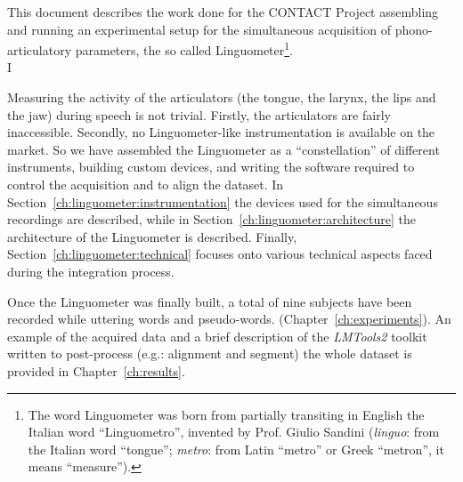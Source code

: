 This document
describes the work done for the 
CONTACT Project assembling and running an experimental setup for the 
simultaneous acquisition of phono-articulatory parameters, the so called 
Linguometer\footnote{The 
word Linguometer was born from partially transiting in English the Italian word
``Linguometro'', invented by Prof. Giulio Sandini
(\emph{linguo}: from the Italian word ``tongue''; \emph{metro}: from Latin 
``metro'' or Greek ``metron'', it means ``measure'').}.\\

I%

Measuring the activity of the articulators (the tongue, the larynx, the lips and
the jaw) during speech is not trivial. 
Firstly, the articulators are fairly inaccessible.
Secondly, no Linguometer-like instrumentation is available on the market.
So we have assembled the Linguometer as a ``constellation'' of
different instruments, building custom devices, and 
writing the software required to control the acquisition and to align the
dataset.
In Section~\ref{ch:linguometer:instrumentation} the devices
used for the simultaneous recordings are described, while in 
Section~\ref{ch:linguometer:architecture} the architecture of
the Linguometer is described. Finally, Section~\ref{ch:linguometer:technical}
focuses onto various technical aspects faced during the integration
process.

Once the Linguometer was finally built, a total of nine
subjects have been recorded while uttering words and pseudo-words.
(Chapter~\ref{ch:experiments}).
An example of the acquired data and a brief description of the \emph{LMTools2}
toolkit written to post-process (e.g.: alignment and segment)
the whole dataset is provided in Chapter~\ref{ch:results}.

\pagebreak
